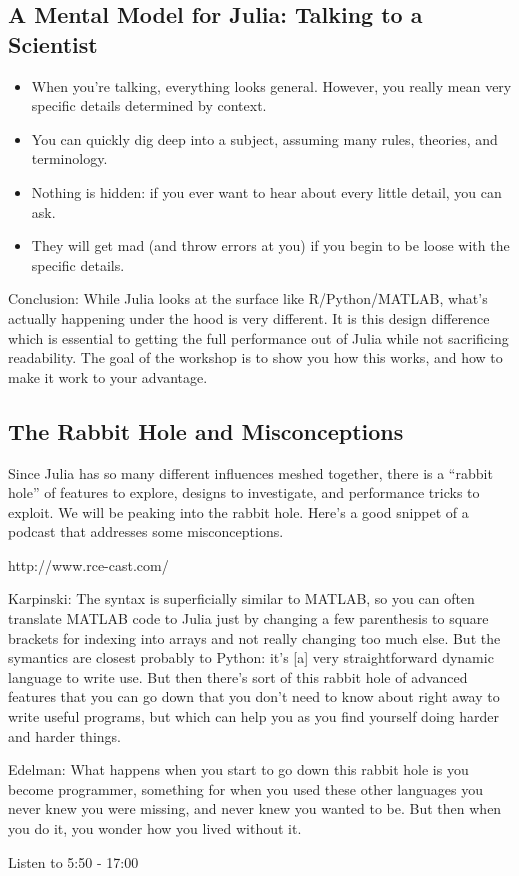 \documentclass[11pt]{article}
\providecommand{\tightlist}{%
      \setlength{\itemsep}{0pt}\setlength{\parskip}{0pt}}
\begin{document}
    \hypertarget{a-mental-model-for-julia-talking-to-a-scientist}{%
\subsection{A Mental Model for Julia: Talking to a
Scientist}\label{a-mental-model-for-julia-talking-to-a-scientist}}

\begin{itemize}
\tightlist
\item
  When you're talking, everything looks general. However, you really
  mean very specific details determined by context.
\item
  You can quickly dig deep into a subject, assuming many rules,
  theories, and terminology.
\item
  Nothing is hidden: if you ever want to hear about every little detail,
  you can ask.
\item
  They will get mad (and throw errors at you) if you begin to be loose
  with the specific details.
\end{itemize}

Conclusion: While Julia looks at the surface like R/Python/MATLAB,
what's actually happening under the hood is very different. It is this
design difference which is essential to getting the full performance out
of Julia while not sacrificing readability. The goal of the workshop is
to show you how this works, and how to make it work to your advantage.

    \hypertarget{the-rabbit-hole-and-misconceptions}{%
\subsection{The Rabbit Hole and
Misconceptions}\label{the-rabbit-hole-and-misconceptions}}

Since Julia has so many different influences meshed together, there is a
``rabbit hole'' of features to explore, designs to investigate, and
performance tricks to exploit. We will be peaking into the rabbit hole.
Here's a good snippet of a podcast that addresses some misconceptions.

http://www.rce-cast.com/

Karpinski: The syntax is superficially similar to MATLAB, so you can
often translate MATLAB code to Julia just by changing a few parenthesis
to square brackets for indexing into arrays and not really changing too
much else. But the symantics are closest probably to Python: it's
{[}a{]} very straightforward dynamic language to write use. But then
there's sort of this rabbit hole of advanced features that you can go
down that you don't need to know about right away to write useful
programs, but which can help you as you find yourself doing harder and
harder things.

Edelman: What happens when you start to go down this rabbit hole is you
become programmer, something for when you used these other languages you
never knew you were missing, and never knew you wanted to be. But then
when you do it, you wonder how you lived without it.

Listen to 5:50 - 17:00


    
    
    
    
\end{document}
